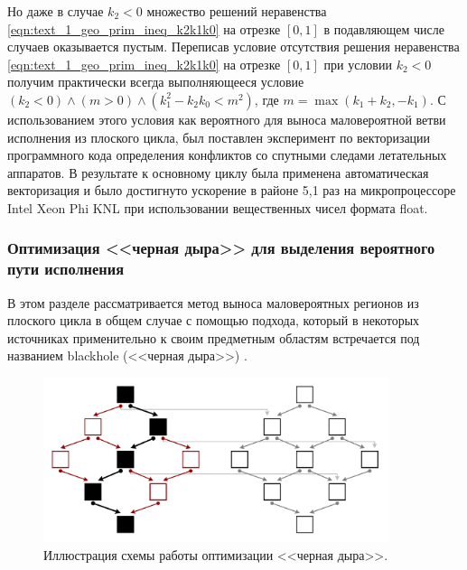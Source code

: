 Но даже в случае $k_2 < 0$ множество решений неравенства \eqref{eqn:text_1_geo_prim_ineq_k2k1k0} на отрезке $[0, 1]$ в подавляющем числе случаев оказывается пустым.
Переписав условие отсутствия решения неравенства \eqref{eqn:text_1_geo_prim_ineq_k2k1k0} на отрезке $[0, 1]$ при условии $k_2 < 0$ получим практически всегда выполняющееся условие $(k_2 < 0) \land (m > 0) \land (k_1^2 - k_2k_0 < m^2)$, где $m = \max(k_1 + k_2, -k_1)$.
С использованием этого условия как вероятного для выноса маловероятной ветви исполнения из плоского цикла, был поставлен эксперимент по векторизации программного кода определения конфликтов со спутными следами летательных аппаратов.
В результате к основному циклу была применена автоматическая векторизация и было достигнуто ускорение в районе 5,1 раз на микропроцессоре Intel Xeon Phi KNL\label{abbr:knl-8} при использовании вещественных чисел формата float.

\subsubsection{Оптимизация <<черная дыра>> для выделения вероятного пути исполнения}

В этом разделе рассматривается метод выноса маловероятных регионов из плоского цикла в общем случае с помощью подхода, который в некоторых источниках применительно к своим предметным областям встречается под названием blackhole (<<черная дыра>>) \cite{Ilbeyi2019}.

\begin{figure}[ht]
\centering
\includegraphics[width=0.9\textwidth]{./fig/vec_blackhole.pdf}
\singlespacing
{}\caption{Иллюстрация схемы работы оптимизации <<черная дыра>>.}
\label{fig:text_4_vec_loc_branch_blackhole}
\end{figure}

